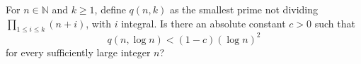 For $n\in\mathbb N$ and $k\geq1$, define $q(n,k)$ as the smallest prime not dividing $\prod_{1\leq i\leq k}(n+i)$, with $i$ integral. Is there an absolute constant $c>0$ such that
\[q(n,\log n)<(1-c)(\log n)^2\]
for every sufficiently large integer $n$?
